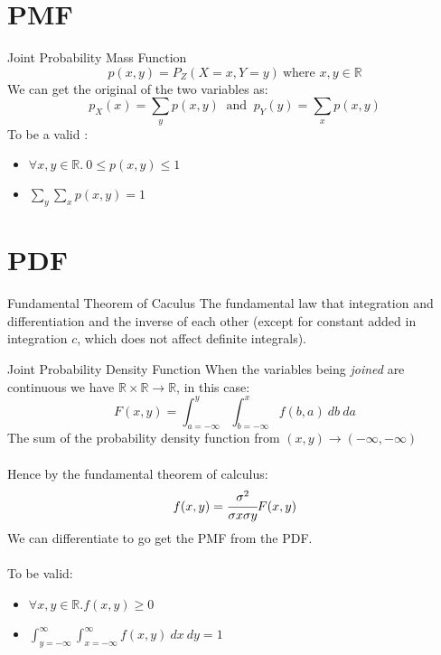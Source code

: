 \section{PMF}
\begin{definitionbox}{Joint Probability Mass Function}
	\[p(x,y) = P_Z(X = x, Y = y) \ \text{where } x,y \in \mathbb{R}\]
	We can get the original  of the two variables as:
	\[p_X(x) = \sum_y p(x,y) \ \text{ and } \ p_Y(y) = \sum_x p(x,y)\]
	To be a valid :
	\begin{itemize}
		\item $\forall x,y \in \mathbb{R}. \ 0 \leq p(x,y) \leq 1$
		\item $\sum_y \sum_x p(x,y) = 1$
	\end{itemize}
\end{definitionbox}

\section{PDF}
\begin{sidenotebox}{Fundamental Theorem of Caculus}
	The fundamental law that integration and differentiation and the inverse of each other (except for constant added in integration $c$, which does not affect definite integrals).
\end{sidenotebox}

\begin{definitionbox}{Joint Probability Density Function}
	When the variables being \textit{joined} are continuous we have $\mathbb{R} \times \mathbb{R} \to \mathbb{R}$, in this case:
	\[F(x,y) = \int_{a=-\infty}^y \int_{b=-\infty}^x f(b,a) \ db \ da\]
	The sum of the probability density function from $(x,y) \to (-\infty, -\infty)$
	\\
	\\ Hence by the fundamental theorem of calculus:
	\[f(x,y) = \cfrac{\sigma^2}{\sigma x \sigma y }F(x,y)\]
	We can differentiate to go get the PMF from the PDF.
	\\
	\\ To be valid:
	\begin{itemize}
		\item $\forall x, y \in \mathbb{R}. f(x,y) \geq 0\ $
		\item $\int_{y=-\infty}^{\infty} \int_{x=-\infty}^{\infty} f(x,y) \ dx \ dy = 1$
	\end{itemize}
\end{definitionbox}


